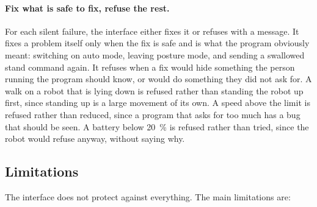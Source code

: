 \paragraph{Fix what is safe to fix, refuse the rest.} For each silent failure, the interface either fixes it
or refuses with a message. It fixes a problem itself only when the fix is safe and is what the program
obviously meant: switching on auto mode, leaving posture mode, and sending a swallowed stand command again.
It refuses when a fix would hide something the person running the program should know, or would do something
they did not ask for. A walk on a robot that is lying down is refused rather than standing the robot up
first, since standing up is a large movement of its own. A speed above the limit is refused rather than
reduced, since a program that asks for too much has a bug that should be seen. A battery below 20~\% is
refused rather than tried, since the robot would refuse anyway, without saying why.

\subsection{Limitations}
\label{sec:limitations}

The interface does not protect against everything. The main limitations are:

